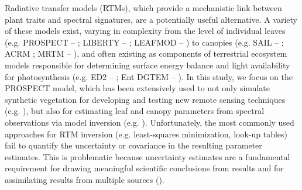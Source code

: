     Radiative transfer models (RTMs), which provide a mechanistic link between 
    plant traits and spectral signatures, are a potentially useful alternative.   
    A variety of these models exist, varying in complexity from the level of 
    individual leaves (e.g. PROSPECT -- \cite{Jacquemoud1990, Feret2008}; 
    LIBERTY -- \cite{Dawson1998, DiVittorio2009}; LEAFMOD -- 
    \cite{Ganapol1998}) to canopies (e.g. SAIL -- \cite{Verhoef1984,
    Jacquemoud2009}; ACRM \cite{Kuusk2001}; MRTM -- \cite{Wang2013}), and often
    existing as components of terrestrial ecosystem models responsible for
    determining surface energy balance and light availability for
    photosynthesis (e.g. ED2 -- \cite{Medvigy2006}; Ent DGTEM --
    \cite{Ni-Meister2010}).  In this study, we focus on the PROSPECT model,
    which has been extensively used to not only simulate synthetic vegetation
    for developing and testing new remote sensing techniques (e.g.
    \cite{LeMaire2004, Feret2011, Hunt2012, Zarco-Tejada2013, Croft2014}), but
    also for estimating leaf and canopy parameters from spectral observations
    via model inversion (e.g.  \cite{Jacquemoud1995, Jacquemoud2009, Feret2008,
    Li2011a, Atzberger2012, Zarco-Tejada2004a}).  Unfortunately, the most
    commonly used approaches for RTM inversion (e.g. least-squares
    minimization, look-up tables) fail to quantify the uncertainty or
    covariance in the resulting parameter estimates. This is problematic
    because uncertainty estimates are a fundamental requirement for drawing
    meaningful scientific conclusions from results and for assimilating results
    from multiple sources (\cite{Cressie2009, Quaife2008}). 

